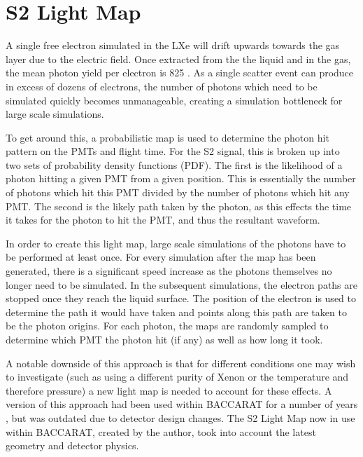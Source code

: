 \section{S2 Light Map}
\label{sec:s2lightmap}
\par
A single free electron simulated in the LXe will drift upwards towards the gas layer due to the electric field.
Once extracted from the the liquid and in the gas, the mean photon yield per electron is 825 \cite{NoPhotonsPerElectron}.
As a single scatter event can produce in excess of dozens of electrons, the number of photons which need to be simulated quickly becomes unmanageable, creating a simulation bottleneck for large scale simulations.
\par
To get around this, a probabilistic map is used to determine the photon hit pattern on the PMTs and flight time.
For the S2 signal, this is broken up into two sets of probability density functions (PDF).
The first is the likelihood of a photon hitting a given PMT from a given position.
This is essentially the number of photons which hit this PMT divided by the number of photons which hit any PMT.
The second is the likely path taken by the photon, as this effects the time it takes for the photon to hit the PMT, and thus the resultant waveform.
\par
In order to create this light map, large scale simulations of the photons have to be performed at least once.
For every simulation after the map has been generated, there is a significant speed increase as the photons themselves no longer need to be simulated.
In the subsequent simulations, the electron paths are stopped once they reach the liquid surface.
The position of the electron is used to determine the path it would have taken and points along this path are taken to be the photon origins. %
For each photon, the maps are randomly sampled to determine which PMT the photon hit (if any) as well as how long it took.

\par
A notable downside of this approach is that for different conditions one may wish to investigate (such as using a different purity of Xenon or the temperature and therefore pressure) a new light map is needed to account for these effects.
A version of this approach had been used within BACCARAT for a number of years \cite{lz_simulations_ref}, but was outdated due to detector design changes.
The S2 Light Map now in use within BACCARAT, created by the author, took into account the latest geometry and detector physics.

